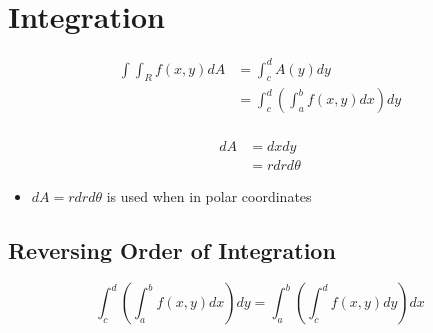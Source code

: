 \section{Integration}

  \begin{align*}
    \int \int_{R} f\left( x, y \right) dA
      &= \int_{c}^{d} A\left( y \right) dy \\
      &= \int_{c}^{d} \left( \int_{a}^{b} f\left( x, y \right) dx \right) dy \\
  \end{align*}

  \begin{align}
    dA &= dx dy \\
    &= r dr d\theta
  \end{align}

  \begin{itemize}
    \item $ dA = r dr d\theta $ is used when in polar coordinates
  \end{itemize}

  \subsection{Reversing Order of Integration}

    \begin{equation}
      \int_{c}^{d} \left( \int_{a}^{b} f\left( x, y \right) dx \right) dy
        = \int_{a}^{b} \left( \int_{c}^{d} f\left( x, y \right) dy \right) dx
    \end{equation}
